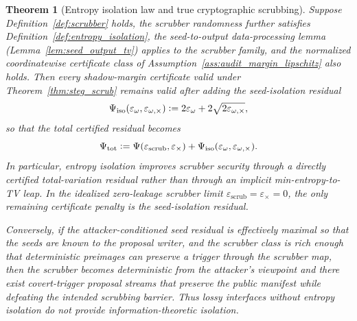 \documentclass[11pt]{article}
\newtheorem{theorem}{Theorem}[section]
\theoremstyle{definition}
\newcommand{\1}{\mathbf{1}}
\newcommand{\Defeq}{\vcentcolon=}
\begin{document}
\begin{theorem}[Entropy isolation law and true cryptographic scrubbing]\label{thm:entropy_isolation}
Suppose Definition~\ref{def:scrubber} holds, the scrubber randomness further satisfies Definition~\ref{def:entropy_isolation}, the seed-to-output data-processing lemma (Lemma~\ref{lem:seed_output_tv}) applies to the scrubber family, and the normalized coordinatewise certificate class of Assumption~\ref{ass:audit_margin_lipschitz} also holds. Then every shadow-margin certificate valid under Theorem~\ref{thm:steg_scrub} remains valid after adding the seed-isolation residual
\[
\Psi_{\mathrm{iso}}(\varepsilon_{\omega},\varepsilon_{\omega,\times})
\Defeq
2\varepsilon_{\omega}+2\sqrt{2\varepsilon_{\omega,\times}},
\]
so that the total certified residual becomes
\[
\Psi_{\mathrm{tot}}
\Defeq
\Psi(\varepsilon_{\mathrm{scrub}},\varepsilon_{\times})
+
\Psi_{\mathrm{iso}}(\varepsilon_{\omega},\varepsilon_{\omega,\times}).
\]
In particular, entropy isolation improves scrubber security through a directly certified total-variation residual rather than through an implicit min-entropy-to-TV leap. In the idealized zero-leakage scrubber limit $\varepsilon_{\mathrm{scrub}}=\varepsilon_{\times}=0$, the only remaining certificate penalty is the seed-isolation residual.

Conversely, if the attacker-conditioned seed residual is effectively maximal so that the seeds are known to the proposal writer, and the scrubber class is rich enough that deterministic preimages can preserve a trigger through the scrubber map, then the scrubber becomes deterministic from the attacker's viewpoint and there exist covert-trigger proposal streams that preserve the public manifest while defeating the intended scrubbing barrier. Thus lossy interfaces without entropy isolation do not provide information-theoretic isolation.
\end{theorem}
\end{document}
